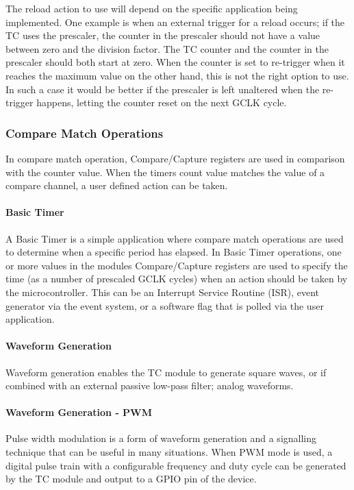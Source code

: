 The reload action to use will depend on the specific application being implemented. One example is when an external trigger for a reload occurs; if the TC uses the prescaler, the counter in the prescaler should not have a value between zero and the division factor. The TC counter and the counter in the prescaler should both start at zero. When the counter is set to re-\/trigger when it reaches the maximum value on the other hand, this is not the right option to use. In such a case it would be better if the prescaler is left unaltered when the re-\/trigger happens, letting the counter reset on the next G\+C\+LK cycle.\hypertarget{group__asfdoc__sam0__tc__group_asfdoc_sam0_tc_module_overview_compare_match}{}\subsubsection{Compare Match Operations}\label{group__asfdoc__sam0__tc__group_asfdoc_sam0_tc_module_overview_compare_match}
In compare match operation, Compare/\+Capture registers are used in comparison with the counter value. When the timer\textquotesingle{}s count value matches the value of a compare channel, a user defined action can be taken.\hypertarget{group__asfdoc__sam0__tc__group_asfdoc_sam0_tc_module_overview_compare_match_timer}{}\paragraph{Basic Timer}\label{group__asfdoc__sam0__tc__group_asfdoc_sam0_tc_module_overview_compare_match_timer}
A Basic Timer is a simple application where compare match operations are used to determine when a specific period has elapsed. In Basic Timer operations, one or more values in the module\textquotesingle{}s Compare/\+Capture registers are used to specify the time (as a number of prescaled G\+C\+LK cycles) when an action should be taken by the microcontroller. This can be an Interrupt Service Routine (I\+SR), event generator via the event system, or a software flag that is polled via the user application.\hypertarget{group__asfdoc__sam0__tc__group_asfdoc_sam0_tc_module_overview_compare_match_wg}{}\paragraph{Waveform Generation}\label{group__asfdoc__sam0__tc__group_asfdoc_sam0_tc_module_overview_compare_match_wg}
Waveform generation enables the TC module to generate square waves, or if combined with an external passive low-\/pass filter; analog waveforms.\hypertarget{group__asfdoc__sam0__tc__group_asfdoc_sam0_tc_module_overview_compare_match_wg_pwm}{}\paragraph{Waveform Generation -\/ P\+WM}\label{group__asfdoc__sam0__tc__group_asfdoc_sam0_tc_module_overview_compare_match_wg_pwm}
Pulse width modulation is a form of waveform generation and a signalling technique that can be useful in many situations. When P\+WM mode is used, a digital pulse train with a configurable frequency and duty cycle can be generated by the TC module and output to a G\+P\+IO pin of the device.

